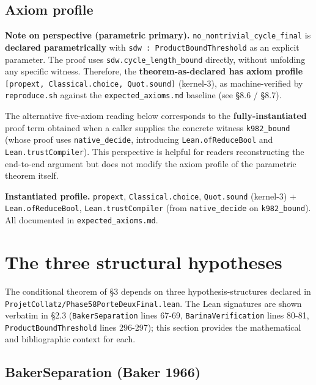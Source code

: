 \documentclass[
  11pt]{amsart}
\theoremstyle{plain}
\theoremstyle{definition}
\theoremstyle{remark}
\begin{document}
\subsection{Axiom profile}\label{axiom-profile}

\textbf{Note on perspective (parametric primary).}
\texttt{no\_nontrivial\_cycle\_final} is \textbf{declared
parametrically} with \texttt{sdw\ :\ ProductBoundThreshold} as an
explicit parameter. The proof uses \texttt{sdw.cycle\_length\_bound}
directly, without unfolding any specific witness. Therefore, the
\textbf{theorem-as-declared has axiom profile}
\texttt{{[}propext,\ Classical.choice,\ Quot.sound{]}} (kernel-3), as
machine-verified by \texttt{reproduce.sh} against the
\texttt{expected\_axioms.md} baseline (see §8.6 / §8.7).

The alternative five-axiom reading below corresponds to the
\textbf{fully-instantiated} proof term obtained when a caller supplies
the concrete witness \texttt{k982\_bound} (whose proof uses
\texttt{native\_decide}, introducing \texttt{Lean.ofReduceBool} and
\texttt{Lean.trustCompiler}). This perspective is helpful for readers
reconstructing the end-to-end argument but does not modify the axiom
profile of the parametric theorem itself.

\textbf{Instantiated profile.} \texttt{propext},
\texttt{Classical.choice}, \texttt{Quot.sound} (kernel-3) +
\texttt{Lean.ofReduceBool}, \texttt{Lean.trustCompiler} (from
\texttt{native\_decide} on \texttt{k982\_bound}). All documented in
\texttt{expected\_axioms.md}.

\section{The three structural
hypotheses}\label{the-three-structural-hypotheses-1}

The conditional theorem of §3 depends on three hypothesis-structures
declared in \texttt{ProjetCollatz/Phase58PorteDeuxFinal.lean}. The Lean
signatures are shown verbatim in §2.3 (\texttt{BakerSeparation} lines
67-69, \texttt{BarinaVerification} lines 80-81,
\texttt{ProductBoundThreshold} lines 296-297); this section provides the
mathematical and bibliographic context for each.

\subsection{BakerSeparation (Baker
1966)}\label{bakerseparation-baker-1966}
\end{document}
